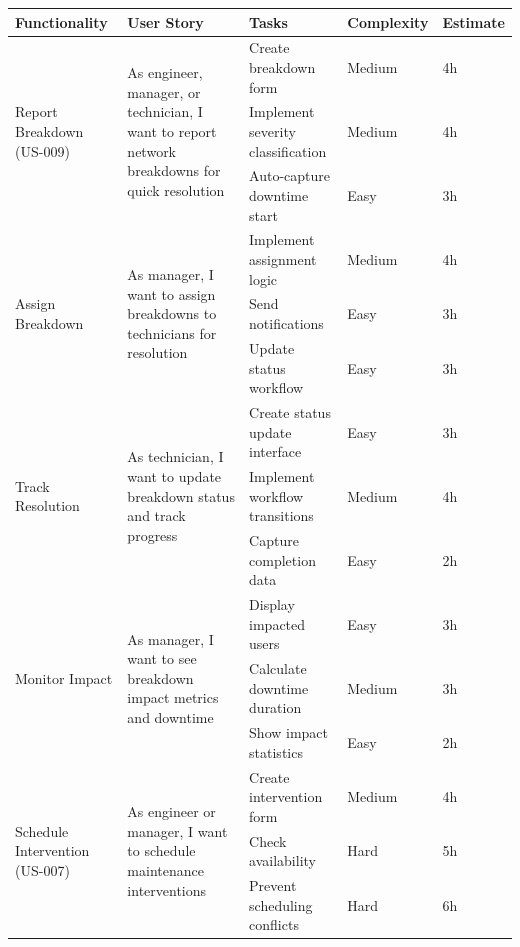 \begin{table}[H]
\centering
\small
\begin{tabular}{|p{2.5cm}|p{4cm}|p{3.2cm}|p{2.2cm}|p{1.5cm}|}
\hline
\textbf{Functionality} & \textbf{User Story} & \textbf{Tasks} & \textbf{Complexity} & \textbf{Estimate} \\
\hline

\multirow{3}{2.5cm}{Report Breakdown (US-009)} & 
\multirow{3}{4cm}{As engineer, manager, or technician, I want to report network breakdowns for quick resolution}
& Create breakdown form & Medium & 4h \\
\cline{3-5}
& & Implement severity classification & Medium & 4h \\
\cline{3-5}
& & Auto-capture downtime start & Easy & 3h \\
\hline

\multirow{3}{2.5cm}{Assign Breakdown} & 
\multirow{3}{4cm}{As manager, I want to assign breakdowns to technicians for resolution}
& Implement assignment logic & Medium & 4h \\
\cline{3-5}
& & Send notifications & Easy & 3h \\
\cline{3-5}
& & Update status workflow & Easy & 3h \\
\hline

\multirow{3}{2.5cm}{Track Resolution} & 
\multirow{3}{4cm}{As technician, I want to update breakdown status and track progress}
& Create status update interface & Easy & 3h \\
\cline{3-5}
& & Implement workflow transitions & Medium & 4h \\
\cline{3-5}
& & Capture completion data & Easy & 2h \\
\hline

\multirow{3}{2.5cm}{Monitor Impact} & 
\multirow{3}{4cm}{As manager, I want to see breakdown impact metrics and downtime}
& Display impacted users & Easy & 3h \\
\cline{3-5}
& & Calculate downtime duration & Medium & 3h \\
\cline{3-5}
& & Show impact statistics & Easy & 2h \\
\hline

\multirow{3}{2.5cm}{Schedule Intervention (US-007)} & 
\multirow{3}{4cm}{As engineer or manager, I want to schedule maintenance interventions}
& Create intervention form & Medium & 4h \\
\cline{3-5}
& & Check availability & Hard & 5h \\
\cline{3-5}
& & Prevent scheduling conflicts & Hard & 6h \\
\hline


\end{tabular}
\end{table}
